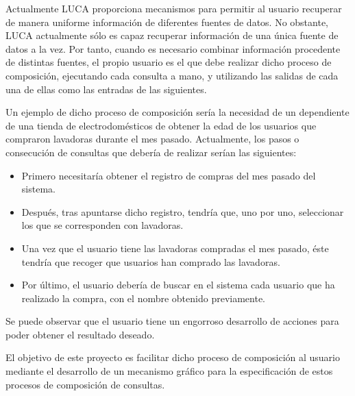 
Actualmente LUCA proporciona mecanismos para permitir al usuario recuperar de manera uniforme información de diferentes fuentes de datos. No obstante, LUCA actualmente sólo es capaz recuperar información de una única fuente de datos a la vez. Por tanto, cuando es necesario combinar información procedente de distintas fuentes, el propio usuario es el que debe realizar dicho proceso de composición, ejecutando cada consulta a mano, y utilizando las salidas de cada una de ellas como las entradas de las siguientes.

\vspace{5mm}
			

Un ejemplo de dicho proceso de composición sería la necesidad de un dependiente de una tienda de electrodomésticos de obtener la edad de los usuarios que compraron lavadoras durante el mes pasado. Actualmente, los pasos o consecución de consultas que debería de realizar serían las siguientes:

\begin{itemize}
	\item  Primero necesitaría obtener el registro de compras del mes pasado del sistema.
	\item  Después, tras apuntarse dicho registro, tendría que, uno por uno, seleccionar los que se corresponden con lavadoras.
	\item Una vez que el usuario tiene las lavadoras compradas el mes pasado, éste tendría que recoger que usuarios han comprado las lavadoras.
	\item Por último, el usuario debería de buscar en el sistema cada usuario que ha realizado la compra, con el nombre obtenido previamente.
\end{itemize}

Se puede observar que el usuario tiene un engorroso desarrollo de acciones para poder obtener el resultado deseado.

\vspace{5mm}


El objetivo de este proyecto es facilitar dicho proceso de composición al usuario mediante el desarrollo de un mecanismo gráfico para la especificación de estos procesos de composición de consultas.

